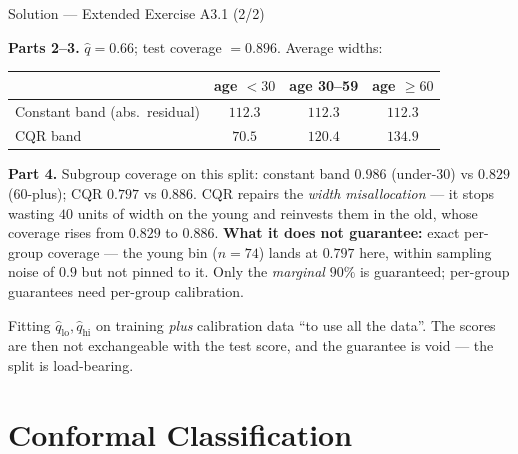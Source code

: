 \documentclass[aspectratio=169,11pt]{beamer}
\begin{document}
\begin{frame}{Solution --- Extended Exercise A3.1 (2/2)}
\begin{solutionbox}
  \textbf{Parts 2--3.} $\hat q = 0.66$; test coverage $= 0.896$. Average widths:
  \begin{center}
  \footnotesize
  \begin{tabular}{@{}lccc@{}}
    \toprule
    & age $<30$ & age 30--59 & age $\ge 60$ \\
    \midrule
    Constant band (abs.\ residual) & $112.3$ & $112.3$ & $112.3$ \\
    CQR band & $70.5$ & $120.4$ & $134.9$ \\
    \bottomrule
  \end{tabular}
  \end{center}
  \textbf{Part 4.} Subgroup coverage on this split: constant band $0.986$ (under-30)
  vs $0.829$ (60-plus); CQR $0.797$ vs $0.886$. CQR repairs the \emph{width
  misallocation} --- it stops wasting $40$ units of width on the young and reinvests
  them in the old, whose coverage rises from $0.829$ to $0.886$.
  \textbf{What it does not guarantee:} exact per-group coverage --- the young bin
  ($n = 74$) lands at $0.797$ here, within sampling noise of $0.9$ but not pinned to
  it. Only the \emph{marginal} $90\%$ is guaranteed; per-group guarantees need
  per-group calibration.
\end{solutionbox}
\begin{mistake}
  Fitting $\hat q_{\text{lo}}, \hat q_{\text{hi}}$ on training \emph{plus} calibration
  data ``to use all the data''. The scores are then not exchangeable with the test
  score, and the guarantee is void --- the split is load-bearing.
\end{mistake}
\end{frame}

\section{Conformal Classification}
\end{document}
